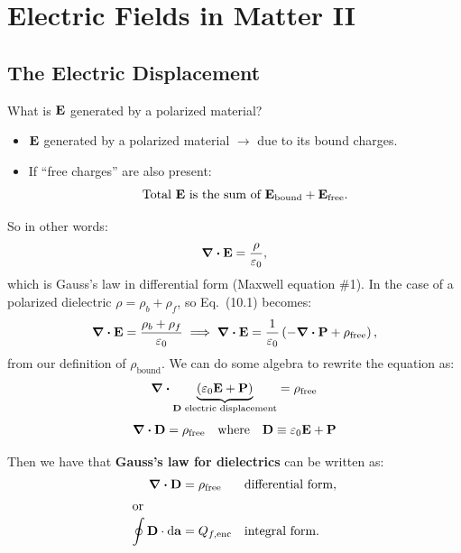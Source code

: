 
\section{Electric Fields in Matter II}

\subsection{The Electric Displacement}

What is $\vb{E}$ generated by a polarized material?
\begin{itemize}
    \item $\vb{E}$ generated by a polarized material $\to$ due to its bound charges.
    \item If ``free charges'' are also present:
    \[
    \text{Total }\vb{E}\text{ is the sum of }\vb{E}_{\text{bound}} + \vb{E}_{\text{free}}.
    \]
\end{itemize}

So in other words:
\begin{equation}
    \div \vb{E} = \frac{\rho}{\varepsilon_0},
\end{equation}
which is Gauss's law in differential form (Maxwell equation \#1). In the case of a polarized dielectric $\rho = \rho_b + \rho_f$, so Eq.~(10.1) becomes:
\begin{equation*}
    \div \vb{E} = \frac{\rho_b + \rho_f}{\varepsilon_0} \implies \div \vb{E} = \frac{1}{\varepsilon_0}\left(-\div \vb{P} + \rho_{\text{free}}\right),
\end{equation*}
from our definition of $\rho_{\text{bound}}$. We can do some algebra to rewrite the equation as:
\begin{equation*}
    \div \underbrace{(\varepsilon_0 \vb{E} + \vb{P})}_{\vb{D}\text{ electric displacement}} = \rho_{\text{free}}
\end{equation*}
\begin{equation}
    \div \vb{D} = \rho_{\text{free}} \quad \text{where} \quad \vb{D} \equiv \varepsilon_0 \vb{E} + \vb{P}
\end{equation}

Then we have that \textbf{Gauss's law for dielectrics} can be written as:
\begin{align*}
    \div \vb{D} &= \rho_{\text{free}} && \text{differential form,} \\
    \intertext{or}
    \oint \vb{D} \cdot \dd{\vb{a}} &= Q_{f,\text{enc}} && \text{integral form.}
\end{align*}

